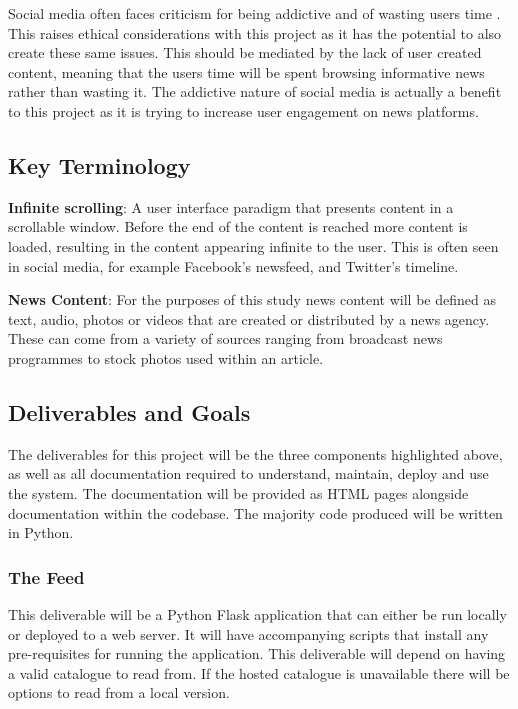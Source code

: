 \documentclass[12pt,titlepage]{article}
\begin{document}
  Social media often faces criticism for being addictive and of wasting users
  time \cite{neyman}. This raises ethical considerations with this project as it
  has the potential to also create these same issues. This should be mediated by
  the lack of user created content, meaning that the users time will be spent
  browsing informative news rather than wasting it. The addictive nature of
  social media is actually a benefit to this project as it is trying to
  increase user engagement on news platforms.

  \subsection{Key Terminology}

  \textbf{Infinite scrolling}: A user interface paradigm that presents content in a
  scrollable window. Before the end of the content is reached more content is
  loaded, resulting in the content appearing infinite to the user. This is often
  seen in social media, for example Facebook's newsfeed, and Twitter's timeline.

  \textbf{News Content}: For the purposes of this study news content will be
  defined as text, audio, photos or videos that are created or distributed by a
  news agency. These can come from a variety of sources ranging from broadcast
  news programmes to stock photos used within an article.

  \subsection{Deliverables and Goals}

  The deliverables for this project will be the three components highlighted
  above, as well as all documentation required to understand, maintain, deploy
  and use the system. The documentation will be provided as HTML pages alongside
  documentation within the codebase. The majority code produced will be written
  in Python.

    \subsubsection{The Feed}

    This deliverable will be a Python Flask application that can either be run
    locally or deployed to a web server. It will have accompanying scripts that
    install any pre-requisites for running the application. This deliverable
    will depend on having a valid catalogue to read from. If the hosted
    catalogue is unavailable there will be options to read from a local version.
\end{document}
